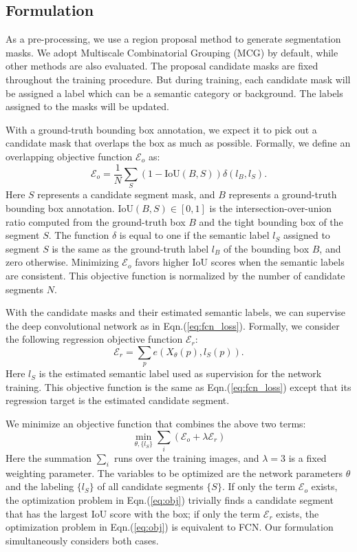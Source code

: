 \documentclass[10pt,twocolumn,letterpaper]{article}
\begin{document}
\subsection{Formulation}

As a pre-processing, we use a region proposal method to generate segmentation masks. We adopt Multiscale Combinatorial Grouping (MCG) \cite{arbelaez2014multiscale} by default, while other methods \cite{uijlings2013selective,krahenbuhl2014geodesic} are also evaluated. The proposal candidate masks are fixed throughout the training procedure. But during training, each candidate mask will be assigned a label which can be a semantic category or background. The labels assigned to the masks will be updated.

With a ground-truth bounding box annotation, we expect it to pick out a candidate mask that overlaps the box as much as possible. Formally, we define an overlapping objective function $\mathcal{E}_o$ as:
\begin{equation}\label{eq:ov}
\mathcal{E}_o = \frac{1}{N}\sum_{S}(1-\text{IoU}(B, S))\delta(l_B, l_S).
\end{equation}
Here $S$ represents a candidate segment mask, and $B$ represents a ground-truth bounding box annotation. $\text{IoU}(B, S)\in[0,1]$ is the intersection-over-union ratio computed from the ground-truth box $B$ and the tight bounding box of the segment $S$. The function $\delta$ is equal to one if the semantic label $l_S$ assigned to segment $S$ is the same as the ground-truth label $l_B$ of the bounding box $B$, and zero otherwise. Minimizing $\mathcal{E}_o$ favors higher IoU scores when the semantic labels are consistent. This objective function is normalized by the number of candidate segments $N$.

With the candidate masks and their estimated semantic labels, we can supervise the deep convolutional network as in Eqn.(\ref{eq:fcn_loss}). Formally, we consider the following regression objective function $\mathcal{E}_r$:
\begin{equation}\label{eq:reg}
\mathcal{E}_r = \sum_{p} e(X_{\theta}(p), l_S(p)).
\end{equation}
Here $l_S$ is the estimated semantic label used as supervision for the network training. This objective function is the same as Eqn.(\ref{eq:fcn_loss}) except that its regression target is the estimated candidate segment.

We minimize an objective function that combines the above two terms:
\begin{equation}\label{eq:obj}
\min_{\theta,\{l_S\}} \sum_{i}(\mathcal{E}_o+\lambda\mathcal{E}_r)
\end{equation}
Here the summation $\sum_{i}$ runs over the training images, and $\lambda=3$ is a fixed weighting parameter. The variables to be optimized are the network parameters $\theta$ and the labeling $\{l_S\}$ of all candidate segments $\{S\}$. If only the term $\mathcal{E}_o$ exists, the optimization problem in Eqn.(\ref{eq:obj}) trivially finds a candidate segment that has the largest IoU score with the box; if only the term $\mathcal{E}_r$ exists, the optimization problem in Eqn.(\ref{eq:obj}) is equivalent to FCN. Our formulation simultaneously considers both cases.
\end{document}
